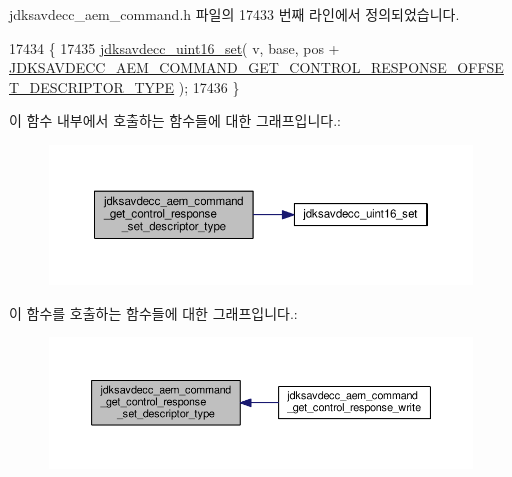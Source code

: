 jdksavdecc\+\_\+aem\+\_\+command.\+h 파일의 17433 번째 라인에서 정의되었습니다.


\begin{DoxyCode}
17434 \{
17435     \hyperlink{group__endian_ga14b9eeadc05f94334096c127c955a60b}{jdksavdecc\_uint16\_set}( v, base, pos + 
      \hyperlink{group__command__get__control__response_ga6d10660f116852b06ee354529f156954}{JDKSAVDECC\_AEM\_COMMAND\_GET\_CONTROL\_RESPONSE\_OFFSET\_DESCRIPTOR\_TYPE}
       );
17436 \}
\end{DoxyCode}


이 함수 내부에서 호출하는 함수들에 대한 그래프입니다.\+:
\nopagebreak
\begin{figure}[H]
\begin{center}
\leavevmode
\includegraphics[width=350pt]{group__command__get__control__response_ga5fc050028d010f6273b5c221e221a85b_cgraph}
\end{center}
\end{figure}




이 함수를 호출하는 함수들에 대한 그래프입니다.\+:
\nopagebreak
\begin{figure}[H]
\begin{center}
\leavevmode
\includegraphics[width=350pt]{group__command__get__control__response_ga5fc050028d010f6273b5c221e221a85b_icgraph}
\end{center}
\end{figure}


